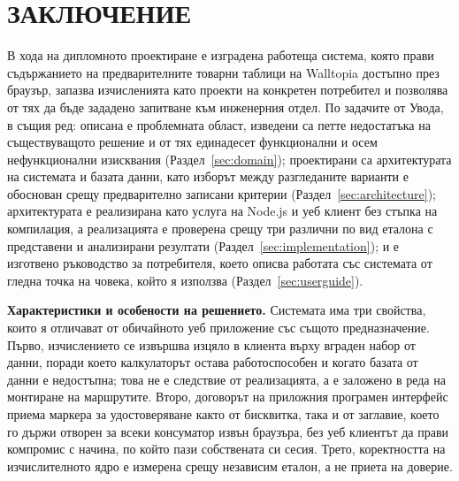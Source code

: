 \section*{ЗАКЛЮЧЕНИЕ}
\label{sec:conclusion}

В хода на дипломното проектиране е изградена работеща система, която прави
съдържанието на предварителните товарни таблици на Walltopia достъпно през браузър,
запазва изчисленията като проекти на конкретен потребител и позволява от тях да бъде
зададено запитване към инженерния отдел. По задачите от Увода, в същия ред: описана е
проблемната област, изведени са петте недостатъка на съществуващото решение и от тях
единадесет функционални и осем нефункционални изисквания (Раздел~\ref{sec:domain});
проектирани са архитектурата на системата и базата данни, като изборът между
разгледаните варианти е обоснован срещу предварително записани критерии
(Раздел~\ref{sec:architecture}); архитектурата е реализирана като услуга на Node.js и
уеб клиент без стъпка на компилация, а реализацията е проверена срещу три различни по
вид еталона с представени и анализирани резултати (Раздел~\ref{sec:implementation});
и е изготвено ръководство за потребителя, което описва работата със системата от
гледна точка на човека, който я използва (Раздел~\ref{sec:userguide}).

\textbf{Характеристики и особености на решението.} Системата има три свойства, които
я отличават от обичайното уеб приложение със същото предназначение. Първо,
изчислението се извършва изцяло в клиента върху вграден набор от данни, поради което
калкулаторът остава работоспособен и когато базата от данни е недостъпна; това не е
следствие от реализацията, а е заложено в реда на монтиране на маршрутите. Второ,
договорът на приложния програмен интерфейс приема маркера за удостоверяване както от
бисквитка, така и от заглавие, което го държи отворен за всеки консуматор извън
браузъра, без уеб клиентът да прави компромис с начина, по който пази собствената си
сесия. Трето, коректността на изчислителното ядро е измерена срещу независим еталон,
а не приета на доверие.

